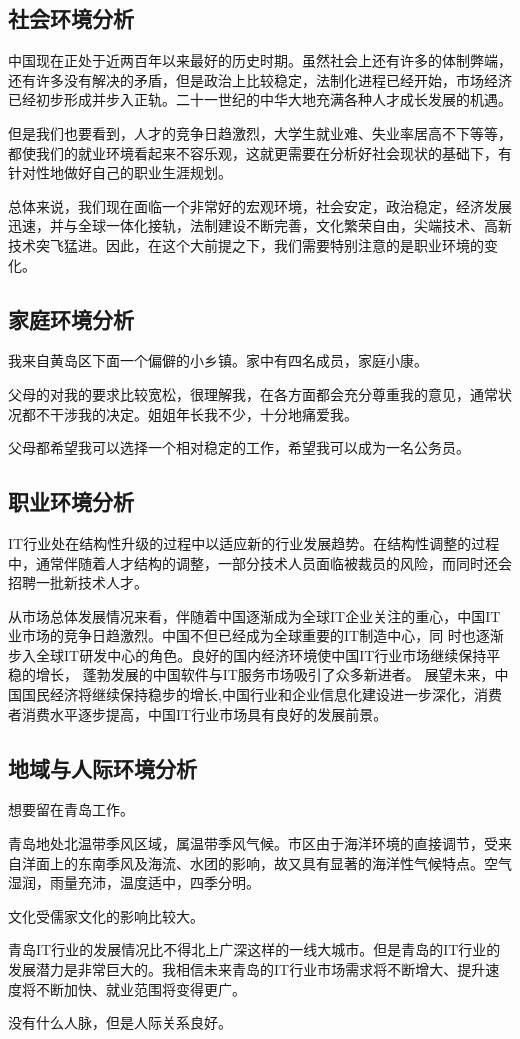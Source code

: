 \documentclass{article}
\begin{document}
\subsection{社会环境分析}
中国现在正处于近两百年以来最好的历史时期。虽然社会上还有许多的体制弊端，还有许多没有解决的矛盾，但是政治上比较稳定，法制化进程已经开始，市场经济已经初步形成并步入正轨。二十一世纪的中华大地充满各种人才成长发展的机遇。\par
但是我们也要看到，人才的竞争日趋激烈，大学生就业难、失业率居高不下等等，都使我们的就业环境看起来不容乐观，这就更需要在分析好社会现状的基础下，有针对性地做好自己的职业生涯规划。\par
总体来说，我们现在面临一个非常好的宏观环境，社会安定，政治稳定，经济发展迅速，并与全球一体化接轨，法制建设不断完善，文化繁荣自由，尖端技术、高新技术突飞猛进。因此，在这个大前提之下，我们需要特别注意的是职业环境的变化。\par
\subsection{家庭环境分析}
我来自黄岛区下面一个偏僻的小乡镇。家中有四名成员，家庭小康。\par
父母的对我的要求比较宽松，很理解我，在各方面都会充分尊重我的意见，通常状况都不干涉我的决定。姐姐年长我不少，十分地痛爱我。\par
父母都希望我可以选择一个相对稳定的工作，希望我可以成为一名公务员。\par
\subsection{职业环境分析}
IT行业处在结构性升级的过程中以适应新的行业发展趋势。在结构性调整的过程中，通常伴随着人才结构的调整，一部分技术人员面临被裁员的风险，而同时还会招聘一批新技术人才。\par
从市场总体发展情况来看，伴随着中国逐渐成为全球IT企业关注的重心，中国IT业市场的竞争日趋激烈。中国不但已经成为全球重要的IT制造中心，同
时也逐渐步入全球IT研发中心的角色。良好的国内经济环境使中国IT行业市场继续保持平稳的增长， 蓬勃发展的中国软件与IT服务市场吸引了众多新进者。
展望未来，中国国民经济将继续保持稳步的增长,中国行业和企业信息化建设进一步深化，消费者消费水平逐步提高，中国IT行业市场具有良好的发展前景。\par


\subsection{地域与人际环境分析}
想要留在青岛工作。\par
青岛地处北温带季风区域，属温带季风气候。市区由于海洋环境的直接调节，受来自洋面上的东南季风及海流、水团的影响，故又具有显著的海洋性气候特点。空气湿润，雨量充沛，温度适中，四季分明。\par
文化受儒家文化的影响比较大。\par
青岛IT行业的发展情况比不得北上广深这样的一线大城市。但是青岛的IT行业的发展潜力是非常巨大的。我相信未来青岛的IT行业市场需求将不断增大、提升速度将不断加快、就业范围将变得更广。\par
没有什么人脉，但是人际关系良好。\par
\end{document}

